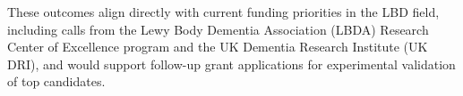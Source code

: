 These outcomes align directly with current funding priorities in the LBD field, including calls from the Lewy Body Dementia Association (LBDA) Research Center of Excellence program and the UK Dementia Research Institute (UK DRI), and would support follow-up grant applications for experimental validation of top candidates.

